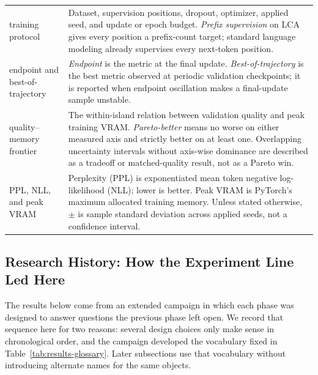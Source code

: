 \documentclass{article}
\theoremstyle{plain}
\theoremstyle{definition}
\theoremstyle{remark}
\begin{document}
\begin{table}[t]
\begin{tabular}{>{\raggedright\arraybackslash}p{}>{\raggedright\arraybackslash}p{}}
training protocol & Dataset, supervision positions, dropout, optimizer, applied seed, and update or epoch budget.  \emph{Prefix supervision} on LCA gives every position a prefix-count target; standard language modeling already supervises every next-token position. \\
endpoint and best-of-trajectory & \emph{Endpoint} is the metric at the final update.  \emph{Best-of-trajectory} is the best metric observed at periodic validation checkpoints; it is reported when endpoint oscillation makes a final-update sample unstable. \\
quality--memory frontier & The within-island relation between validation quality and peak training VRAM.  \emph{Pareto-better} means no worse on either measured axis and strictly better on at least one.  Overlapping uncertainty intervals without axis-wise dominance are described as a tradeoff or matched-quality result, not as a Pareto win. \\
PPL, NLL, and peak VRAM & Perplexity (PPL) is exponentiated mean token negative log-likelihood (NLL); lower is better.  Peak VRAM is PyTorch's maximum allocated training memory.  Unless stated otherwise, $\pm$ is sample standard deviation across applied seeds, not a confidence interval. \\
\bottomrule
\end{tabular}
\end{table}

\subsection{Research History: How the Experiment Line Led Here}
\label{sec:results-research-history}

The results below come from an extended campaign in which each phase was
designed to answer questions the previous phase left open.  We record that
sequence here for two reasons: several design choices only make sense in
chronological order, and the campaign developed the vocabulary fixed in
Table~\ref{tab:results-glossary}.  Later subsections use that vocabulary
without introducing alternate names for the same objects.
\end{document}
